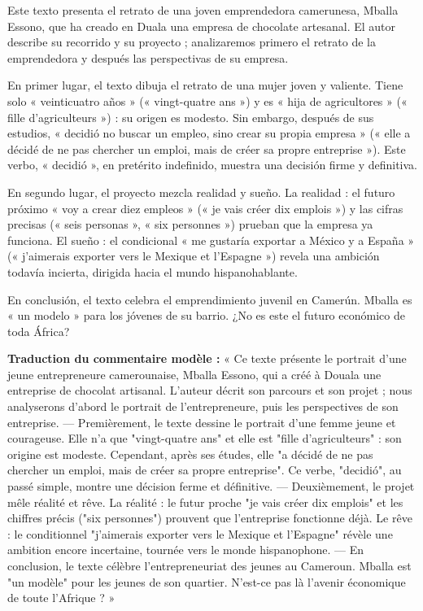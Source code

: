 \documentclass[11pt]{article}
\begin{document}
\begin{textebox}
Este texto presenta el retrato de una joven emprendedora camerunesa, Mballa Essono, que ha creado en Duala una empresa de chocolate artesanal. El autor describe su recorrido y su proyecto ; analizaremos primero el retrato de la emprendedora y después las perspectivas de su empresa.

En primer lugar, el texto dibuja el retrato de una mujer joven y valiente. Tiene solo « veinticuatro años » (« vingt-quatre ans ») y es « hija de agricultores » (« fille d'agriculteurs ») : su origen es modesto. Sin embargo, después de sus estudios, « decidió no buscar un empleo, sino crear su propia empresa » (« elle a décidé de ne pas chercher un emploi, mais de créer sa propre entreprise »). Este verbo, « decidió », en pretérito indefinido, muestra una decisión firme y definitiva.

En segundo lugar, el proyecto mezcla realidad y sueño. La realidad : el futuro próximo « voy a crear diez empleos » (« je vais créer dix emplois ») y las cifras precisas (« seis personas », « six personnes ») prueban que la empresa ya funciona. El sueño : el condicional « me gustaría exportar a México y a España » (« j'aimerais exporter vers le Mexique et l'Espagne ») revela una ambición todavía incierta, dirigida hacia el mundo hispanohablante.

En conclusión, el texto celebra el emprendimiento juvenil en Camerún. Mballa es « un modelo » para los jóvenes de su barrio. ¿No es este el futuro económico de toda África?
\end{textebox}

\textbf{Traduction du commentaire modèle :} « Ce texte présente le portrait d'une jeune entrepreneure camerounaise, Mballa Essono, qui a créé à Douala une entreprise de chocolat artisanal. L'auteur décrit son parcours et son projet ; nous analyserons d'abord le portrait de l'entrepreneure, puis les perspectives de son entreprise. — Premièrement, le texte dessine le portrait d'une femme jeune et courageuse. Elle n'a que "vingt-quatre ans" et elle est "fille d'agriculteurs" : son origine est modeste. Cependant, après ses études, elle "a décidé de ne pas chercher un emploi, mais de créer sa propre entreprise". Ce verbe, "decidió", au passé simple, montre une décision ferme et définitive. — Deuxièmement, le projet mêle réalité et rêve. La réalité : le futur proche "je vais créer dix emplois" et les chiffres précis ("six personnes") prouvent que l'entreprise fonctionne déjà. Le rêve : le conditionnel "j'aimerais exporter vers le Mexique et l'Espagne" révèle une ambition encore incertaine, tournée vers le monde hispanophone. — En conclusion, le texte célèbre l'entrepreneuriat des jeunes au Cameroun. Mballa est "un modèle" pour les jeunes de son quartier. N'est-ce pas là l'avenir économique de toute l'Afrique ? »
\end{document}
